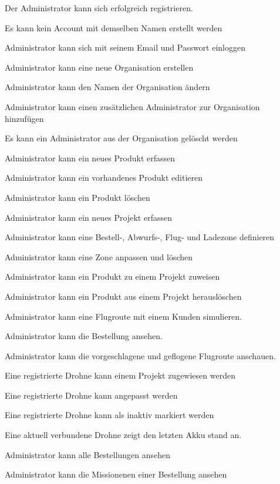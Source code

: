\begin{todolist}
	\item[\done] Der Administrator kann sich erfolgreich registrieren.
	\item[\xmark] Es kann kein Account mit demselben Namen erstellt werden
	\item[\done] Administrator kann sich mit seinem Email und Passwort einloggen
	\item[\done] Administrator kann eine neue Organisation erstellen
	\item[\done] Administrator kann den Namen der Organisation ändern
	\item[\xmark] Administrator kann einen zusätzlichen Administrator zur Organisation hinzufügen
	\item[\xmark] Es kann ein Administrator aus der Organisation gelöscht werden
	\item[\done] Administrator kann ein neues Produkt erfassen
	\item[\done] Administrator kann ein vorhandenes Produkt editieren
	\item[\done] Administrator kann ein Produkt löschen
	\item[\done] Administrator kann ein neues Projekt erfassen
	\item[\xmark] Administrator kann eine Bestell-, Abwurfs-, Flug- und Ladezone definieren
	\item[\xmark] Administrator kann eine Zone anpassen und löschen
	\item[\xmark] Administrator kann ein Produkt zu einem Projekt zuweisen
	\item[\xmark] Administrator kann ein Produkt aus einem Projekt herauslöschen
	\item[\xmark] Administrator kann eine Flugroute mit einem Kunden simulieren.
	
	\item[\xmark] Administrator kann die Bestellung ansehen.
	\item[\xmark] Administrator kann die vorgeschlagene und geflogene Flugroute anschauen.
	
	\item[\done] Eine registrierte Drohne kann einem Projekt zugewiesen werden
	\item[\xmark] Eine registrierte Drohne kann angepasst werden
	\item[\xmark] Eine registrierte Drohne kann als inaktiv markiert werden
	\item[\xmark] Eine aktuell verbundene Drohne zeigt den letzten Akku stand an.
	\item[\xmark] Administrator kann alle Bestellungen ansehen
	\item[\xmark] Administrator kann die Missionenen einer Bestellung ansehen
	

\end{todolist}
